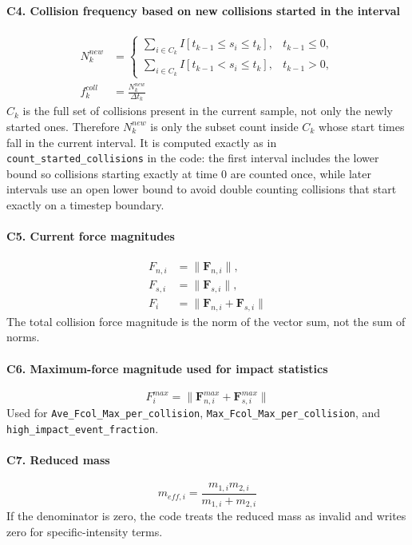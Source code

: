 \documentclass[11pt,a4paper]{article}
\newcommand{\code}[1]{\begingroup\urlstyle{tt}\footnotesize\nolinkurl{#1}\endgroup}
\begin{document}
\paragraph{C4. Collision frequency based on new collisions started in the interval}
\[
\begin{aligned}
N_k^{new} &=
\begin{cases}
\sum_{i \in C_k} I[t_{k-1} \le s_i \le t_k], & t_{k-1} \le 0, \\
\sum_{i \in C_k} I[t_{k-1} < s_i \le t_k], & t_{k-1} > 0,
\end{cases} \\
f_k^{coll} &= \frac{N_k^{new}}{\Delta t_k}
\end{aligned}
\]
$C_k$ is the full set of collisions present in the current sample, not only the newly started ones. Therefore $N_k^{new}$ is only the subset count inside $C_k$ whose start times fall in the current interval. It is computed exactly as in \code{count_started_collisions} in the code: the first interval includes the lower bound so collisions starting exactly at time $0$ are counted once, while later intervals use an open lower bound to avoid double counting collisions that start exactly on a timestep boundary.

\paragraph{C5. Current force magnitudes}
\[
\begin{aligned}
F_{n,i} &= \|\mathbf{F}_{n,i}\|, \\
F_{s,i} &= \|\mathbf{F}_{s,i}\|, \\
F_i &= \|\mathbf{F}_{n,i} + \mathbf{F}_{s,i}\|
\end{aligned}
\]
The total collision force magnitude is the norm of the vector sum, not the sum of norms.

\paragraph{C6. Maximum-force magnitude used for impact statistics}
\[
F_i^{max} = \|\mathbf{F}_{n,i}^{max} + \mathbf{F}_{s,i}^{max}\|
\]
Used for \code{Ave_Fcol_Max_per_collision}, \code{Max_Fcol_Max_per_collision}, and \code{high_impact_event_fraction}.

\paragraph{C7. Reduced mass}
\[
m_{eff,i} = \frac{m_{1,i} m_{2,i}}{m_{1,i} + m_{2,i}}
\]
If the denominator is zero, the code treats the reduced mass as invalid and writes zero for specific-intensity terms.
\end{document}
